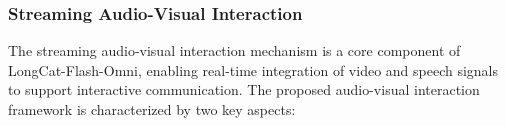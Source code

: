 \documentclass{article}
\begin{document}


\subsubsection{Streaming Audio-Visual Interaction}
\label{subsec:audio-visual-design}

The streaming audio-visual interaction mechanism is a core component of LongCat-Flash-Omni, enabling real-time integration of video and speech signals to support interactive communication. The proposed audio-visual interaction framework is characterized by two key aspects:
\end{document}
